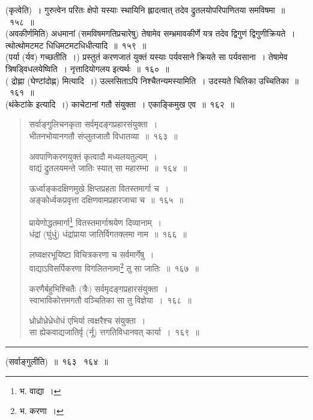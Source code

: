 \documentclass[11pt, openany]{book}
\begin{document}
(कृत्वेति)~। गुरुत्वेन परितः क्षेपो यस्याः स्थायिनि ह्लादत्वात् तदेव द्रुतलयोपरिपाणितया समविषमा~॥~१५८~॥\\

(अवकीर्णमिति) अधमानां (समविषमगतिप्रचारेषु) तेषामेव सम्भ्रमावकीर्णे यत्र तदेव द्विगुणं द्विगुणीक्रियते~। त्थोत्थोमटमट धिधिमटमटधिधीत्यादि~॥~१५९~॥\\

(पर्या (र्यव) गच्छतीति~।) प्रस्तुतं करणजातं युक्तं यस्याः पर्यवसाने क्रियते सा पर्यवसाना~। तेषामेव त्रिषड्विधलयेष्विति~। नृत्तादियोगलय इत्यर्थः~॥~१६०~॥\\

( द्रोह्णा (घेण्टांदोह्ण) मित्यादि~।) उल्लसिताऽपि निश्चैतन्यमस्यामिति~। उदस्यते चितिका उच्चितिका~॥~१६१~॥\\

(थंकेटांके इत्यादि~।) काचेटानां गतौ संयुक्ता~। एकाङ्किमुख एव~॥~१६२~॥

\newpage

\begin{quote}
{\na सर्वाङ्गुलिचनकृता सर्वमृदङ्गप्रहारसंयुक्ता~।\\
भीतनभोयानगतौ संप्लुतजातौ विधातव्या~॥~१६३~॥

अवपाणिकरणयुक्तं कृत्वादौ मध्यलयतुल्यम्~।\\
वाद्यं द्रुतलयमन्ते जातिः स्यात् सा महारम्भा~॥~१६४~॥

ऊर्ध्वाङ्कदक्षिणमुखे क्षिप्तप्रहता वितस्तमार्गा च~।\\
अङ्कोर्ध्वकप्रवृत्ता दक्षिणवामप्रहारजाचा च~॥~१६५~॥

प्रायेणोद्धतमार्गा\renewcommand{\thefootnote}{1}\footnote{भ. वाद्या~।} वितस्तमार्गाश्रयेण दिव्यानाम्~।\\
धंद्रां (घुंधुं) धंद्रांप्राया जातिर्विगतक्लमा नाम~॥~१६६~॥

लघ्वक्षरभूयिष्टा विचित्रकरणा च सर्वमार्गेषु~।\\
वाद्याऽविसर्पिकरणा विगलितनामा\renewcommand{\thefootnote}{2}\footnote{भ. करणा~।} तु सा जातिः~॥~१६७~॥

करणैर्बहुभिश्चितैः (त्रैः) सर्वमृदङ्गप्रहारसंयुक्ता~।\\
स्वाभाविकोत्तमगतौ वञ्चितिका सा तु विज्ञेया~।~१६८~॥ 

ध्रोध्रोध्रेध्रेधोधं एभिर्या त्वक्षरैश्च संयुक्ता~।\\
सा ह्येकवाद्यजातिर्वृ (र्नू) त्तगतिविधानवत् कार्या~।~१६९~॥}
\end{quote}

\hrule

\vspace{2mm}
({\qtt सर्वाङ्गुलीति})~॥~१६३ \textendash\ १६४~॥\\
\end{document}
